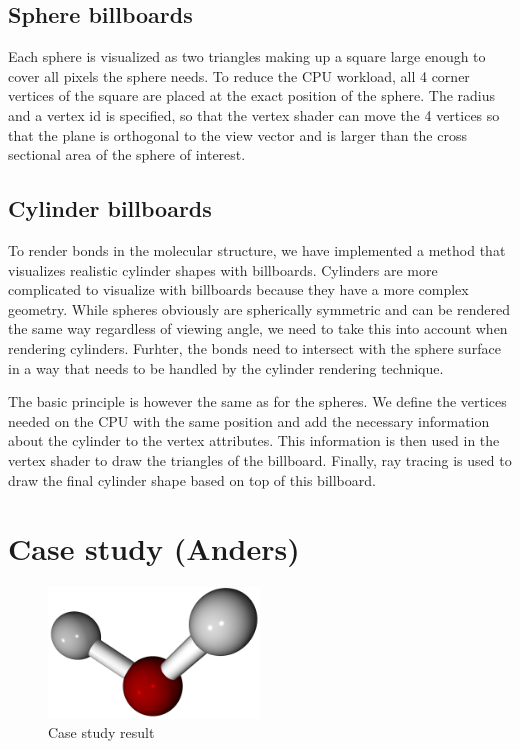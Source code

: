 \documentclass[aps,pre,twocolumn,letterpaper,floatfix,nofootinbib]{revtex4}
\begin{document}
\subsection{Sphere billboards}

Each sphere is visualized as two triangles making up a square large enough to
cover all pixels the sphere needs.
To reduce the CPU workload, all 4 corner vertices of the square are placed at
the exact position of the sphere.
The radius and a vertex id is specified, so that the vertex shader can move the
4 vertices so that the plane is orthogonal to the view vector and is larger than
the cross sectional area of the sphere of interest.

\subsection{Cylinder billboards}
%
To render bonds in the molecular structure, we have implemented a method that
visualizes realistic cylinder shapes with billboards.
Cylinders are more complicated to visualize with billboards because they have a
more complex geometry.
While spheres obviously are spherically symmetric and can be rendered the same
way regardless of viewing angle, we need to take this into account when
rendering cylinders.
Furhter, the bonds need to intersect with the sphere surface in a way that
needs to be handled by the cylinder rendering technique.

The basic principle is however the same as for the spheres.
We define the vertices needed on the CPU with the same position and add the
necessary information about the cylinder to the vertex attributes.
This information is then used in the vertex shader to draw the triangles of
the billboard.
Finally, ray tracing is used to draw the final cylinder shape based on top
of this billboard.



\section{Case study (Anders)}


\begin{figure}
	\centering
	\includegraphics[width=0.5\textwidth]{final_billboard.png}
	\caption{Case study result}
	\label{fig:gui}
\end{figure}
\end{document}
